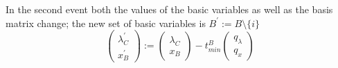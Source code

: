 \documentclass[a4paper]{article}
\begin{document}
In the second event both the values of the basic variables as well as the basis matrix change; the new set of basic variables is $B^{\prime}:=B \setminus \{i\}$
\begin{equation}
\left(
\begin{array}{c}
\lambda_{C}^{\prime} \\
\hline
x_{B}^{\prime}
\end{array}
\right)
:=
\left(
\begin{array}{c}
\lambda_{C} \\
\hline
x_{B}
\end{array}
\right)
-t_{min}^{B}
\left(
\begin{array}{c}
q_{\lambda} \\
\hline
q_{x}
\end{array}
\right)
\end{equation}
\end{document}
